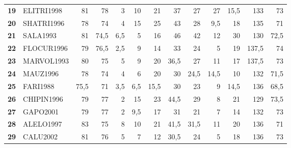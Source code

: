 \begin{landscape}
\begin{table}[p]
\begin{tabular}{>{\bfseries}cl*{11}{D{,}{,}{3.1}}}
19 & ELITRI1998 & 81 & 78 & 3 & 10 & 21 & 37 & 27 & 27 & 15,5 & 133 & 73 \\
20 & SHATRI1996 & 78 & 74 & 4 & 15 & 25 & 43 & 28 & 9,5 & 18 & 135 & 71 \\
21 & SALA1993 & 81 & 74,5 & 6,5 & 5 & 16 & 46 & 42 & 12 & 30 & 130 & 72,5 \\
22 & FLOCUR1996 & 79 & 76,5 & 2,5 & 9 & 14 & 33 & 24 & 5 & 19 & 137,5 & 74 \\
23 & MARVOL1993 & 80 & 75 & 5 & 9 & 20 & 36,5 & 27 & 11 & 17 & 137,5 & 73 \\
24 & MAUZ1996 & 78 & 74 & 4 & 6 & 20 & 30 & 24,5 & 14,5 & 10 & 132 & 71,5 \\
25 & FARI1988 & 75,5 & 71 & 3,5 & 6,5 & 15,5 & 30 & 23 & 9 & 14,5 & 136 & 68,5 \\
26 & CHIPIN1996 & 79 & 77 & 2 & 15 & 23 & 44,5 & 29 & 8 & 21 & 129 & 73,5 \\
27 & GAPO2001 & 79 & 77 & 2 & 9,5 & 17 & 31 & 21 & 7 & 14 & 132 & 73 \\
28 & ALELO1997 & 83 & 75 & 8 & 10 & 21 & 41,5 & 31,5 & 11 & 20 & 136 & 71 \\
29 & CALU2002 & 81 & 76 & 5 & 7 & 12 & 30,5 & 24 & 5 & 18 & 136 & 73 \\
\bottomrule
\end{tabular}
\end{table}


\end{landscape}

